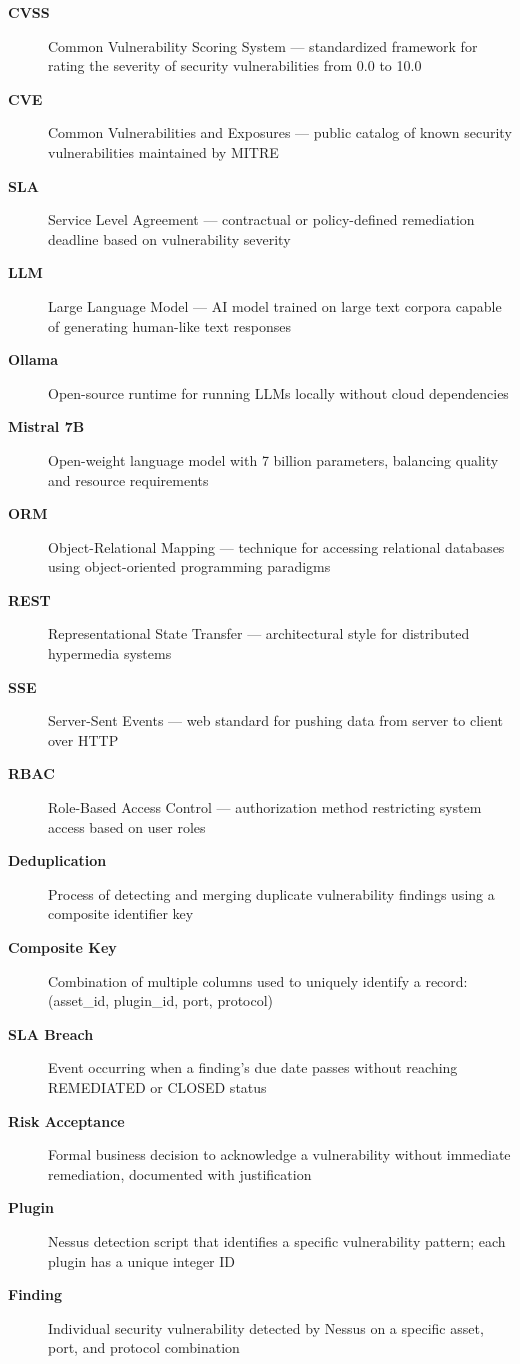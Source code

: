 \begin{description}
  \item[\textbf{CVSS}] Common Vulnerability Scoring System — standardized framework for rating the severity of security vulnerabilities from 0.0 to 10.0
  \item[\textbf{CVE}] Common Vulnerabilities and Exposures — public catalog of known security vulnerabilities maintained by MITRE
  \item[\textbf{SLA}] Service Level Agreement — contractual or policy-defined remediation deadline based on vulnerability severity
  \item[\textbf{LLM}] Large Language Model — AI model trained on large text corpora capable of generating human-like text responses
  \item[\textbf{Ollama}] Open-source runtime for running LLMs locally without cloud dependencies
  \item[\textbf{Mistral 7B}] Open-weight language model with 7 billion parameters, balancing quality and resource requirements
  \item[\textbf{ORM}] Object-Relational Mapping — technique for accessing relational databases using object-oriented programming paradigms
  \item[\textbf{REST}] Representational State Transfer — architectural style for distributed hypermedia systems
  \item[\textbf{SSE}] Server-Sent Events — web standard for pushing data from server to client over HTTP
  \item[\textbf{RBAC}] Role-Based Access Control — authorization method restricting system access based on user roles
  \item[\textbf{Deduplication}] Process of detecting and merging duplicate vulnerability findings using a composite identifier key
  \item[\textbf{Composite Key}] Combination of multiple columns used to uniquely identify a record: (asset\_id, plugin\_id, port, protocol)
  \item[\textbf{SLA Breach}] Event occurring when a finding's due date passes without reaching REMEDIATED or CLOSED status
  \item[\textbf{Risk Acceptance}] Formal business decision to acknowledge a vulnerability without immediate remediation, documented with justification
  \item[\textbf{Plugin}] Nessus detection script that identifies a specific vulnerability pattern; each plugin has a unique integer ID
  \item[\textbf{Finding}] Individual security vulnerability detected by Nessus on a specific asset, port, and protocol combination
\end{description}
